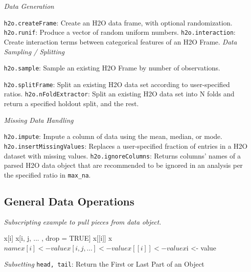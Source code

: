 \emph{Data Generation}\par
{\texttt{h2o.createFrame}}: Create an H2O data frame, with optional randomization.\newline
{\texttt{h2o.runif}}: Produce a vector of random uniform numbers.\newline
{\texttt{h2o.interaction}}: Create interaction terms between categorical features of an H2O Frame.\newline
\newpage
\emph{Data Sampling / Splitting}\par
 {\texttt{h2o.sample}}: Sample an existing H2O Frame by number of observations.\newline %
{\texttt{h2o.splitFrame}: Split an existing H2O data set according to user-specified ratios.\newline
{\texttt{h2o.nFoldExtractor}}: Split an existing H2O data set into N folds and return a specified holdout split, and the rest.\newline%

\emph{Missing Data Handling}\par
{\texttt{h2o.impute}}: Impute a column of data using the mean, median, or mode.\newline
{\texttt{h2o.insertMissingValues}}: Replaces a user-specified fraction of entries in a H2O dataset with missing values.\newline
{\texttt{h2o.ignoreColumns}}: Returns columns' names of a parsed H2O data object that are recommended to be ignored in an analysis per the specified ratio in {\texttt{max\_na}}.\newline%

\subsection{General Data Operations}

\emph{Subscripting example to pull pieces from data object.} 
\begin{spverbatim} 
  x[i]
  x[i, j, ... , drop = TRUE]
  x[[i]]
  x$name 

  x[i] <- value
  x[i, j, ...] <- value
  x[[i]] <- value
  x$i <- value
\end{spverbatim}

\emph{Subsetting}\newline
{\texttt{head, tail}}: Return the First or Last Part of an Object\newline

}
